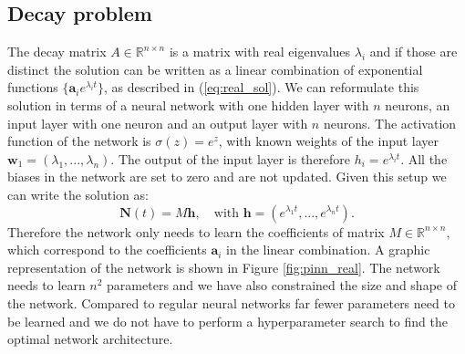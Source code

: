 \documentclass[10pt]{article}
\begin{document}
\subsection{Decay problem}
The decay matrix $A \in \mathbb{R}^{n\times n}$ is a matrix with real eigenvalues $\lambda_i$ and if those are distinct the solution can be written as a linear combination of exponential functions $\{\mathbf{a}_i e^{\lambda_i t}\}$, as described in (\ref{eq:real_sol}). We can reformulate this solution in terms of a neural network with one hidden layer with $n$ neurons, an input layer with one neuron and an output layer with $n$ neurons. The activation function of the network is $\sigma(z) = e^z$, with known weights of the input layer $\mathbf{w}_1 = (\lambda_1, ..., \lambda_n)$. The output of the input layer is therefore $h_i = e^{\lambda_i t}$. All the biases in the network are set to zero and are not updated. Given this setup we can write the solution as:
\begin{equation*}
    \mathbf{N}(t) = M\mathbf{h},\quad\text{with }\mathbf{h} = (e^{\lambda_1 t}, ..., e^{\lambda_n t}).
\end{equation*}
Therefore the network only needs to learn the coefficients of matrix $M \in \mathbb{R}^{n\times n}$, which correspond to the coefficients $\mathbf{a}_i$ in the linear combination. A graphic representation of the network is shown in Figure \ref{fig:pinn_real}. The network needs to learn $n^2$ parameters and we have also constrained the size and shape of the network. Compared to regular neural networks far fewer parameters need to be learned and we do not have to perform a hyperparameter search to find the optimal network architecture.
\end{document}
